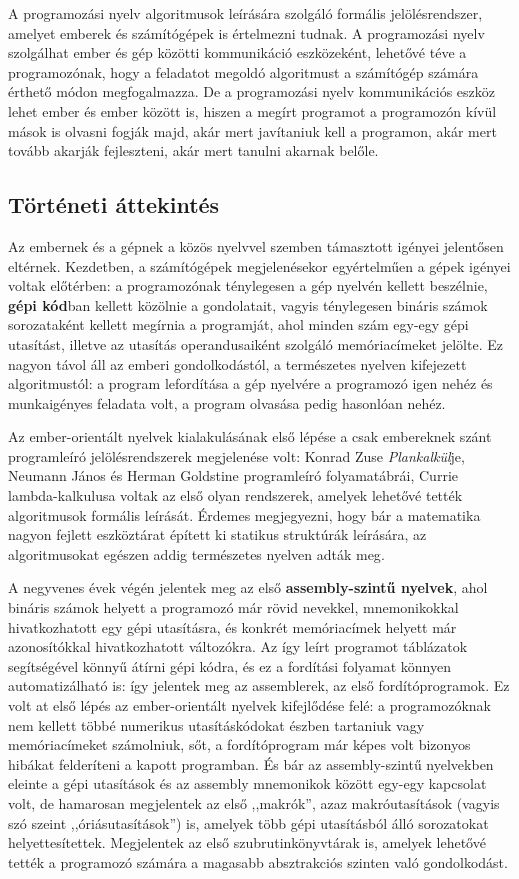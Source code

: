 A programozási nyelv algoritmusok leírására szolgáló formális jelölésrendszer, amelyet emberek és számítógépek is értelmezni tudnak.
A programozási nyelv szolgálhat ember és gép közötti kommunikáció eszközeként, lehetővé téve a programozónak, hogy a feladatot megoldó algoritmust a számítógép számára érthető módon megfogalmazza.
De a programozási nyelv kommunikációs eszköz lehet ember és ember között is, hiszen a megírt programot a programozón kívül mások is olvasni fogják majd, akár mert javítaniuk kell a programon, akár mert tovább akarják fejleszteni, akár mert tanulni akarnak belőle.


\subsection{Történeti áttekintés}
Az embernek és a gépnek a közös nyelvvel szemben támasztott igényei jelentősen eltérnek.
Kezdetben, a számítógépek megjelenésekor egyértelműen a gépek igényei voltak előtérben: a programozónak ténylegesen a gép nyelvén kellett beszélnie, \textbf{gépi kód}ban kellett közölnie a gondolatait, vagyis ténylegesen bináris számok sorozataként kellett megírnia a programját, ahol minden szám egy-egy gépi utasítást, illetve az utasítás operandusaiként szolgáló memóriacímeket jelölte.
Ez nagyon távol áll az emberi gondolkodástól, a természetes nyelven kifejezett algoritmustól: a program lefordítása a gép nyelvére a programozó igen nehéz és munkaigényes feladata volt, a program olvasása pedig hasonlóan nehéz.

Az ember-orientált nyelvek kialakulásának első lépése a csak embereknek szánt programleíró jelölésrendszerek megjelenése volt: Konrad Zuse \textit{Plankalkül}je, Neumann János és Herman Goldstine programleíró folyamatábrái, Currie lambda-kalkulusa voltak az első olyan rendszerek, amelyek lehetővé tették algoritmusok formális leírását.
Érdemes megjegyezni, hogy bár a matematika nagyon fejlett eszköztárat épített ki statikus struktúrák leírására, az algoritmusokat egészen addig természetes nyelven adták meg\cite{KnuthTrabbPardo}.

A negyvenes évek végén jelentek meg az első \textbf{assembly-szintű nyelvek}, ahol bináris számok helyett a programozó már rövid nevekkel, mnemonikokkal hivatkozhatott egy gépi utasításra, és konkrét memóriacímek helyett már azonosítókkal hivatkozhatott változókra.
Az így leírt programot táblázatok segítségével könnyű átírni gépi kódra, és ez a fordítási folyamat könnyen automatizálható is: így jelentek meg az assemblerek, az első fordítóprogramok.
Ez volt at első lépés az ember-orientált nyelvek kifejlődése felé: a programozóknak nem kellett többé numerikus utasításkódokat észben tartaniuk vagy memóriacímeket számolniuk, sőt, a fordítóprogram már képes volt bizonyos hibákat felderíteni a kapott programban. És bár az assembly-szintű nyelvekben eleinte a gépi utasítások és az assembly mnemonikok között egy-egy kapcsolat volt, de hamarosan megjelentek az első ,,makrók'', azaz makróutasítások (vagyis szó szeint ,,óriásutasítások'') is,  amelyek több gépi utasításból álló sorozatokat helyettesítettek.
Megjelentek az első szubrutinkönyvtárak is, amelyek lehetővé tették a programozó számára a magasabb absztrakciós szinten való gondolkodást.


